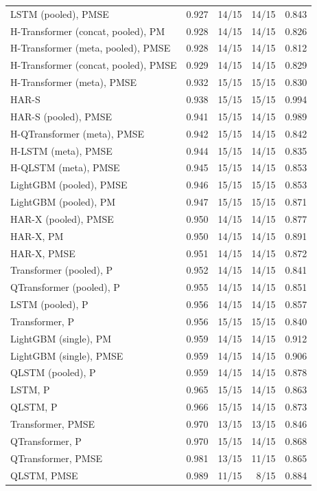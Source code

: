 \begin{tabular}{lrrrr}
LSTM (pooled), PMSE & 0.927 & 14/15 & 14/15 & 0.843 \\
H-Transformer (concat, pooled), PM & 0.928 & 14/15 & 14/15 & 0.826 \\
H-Transformer (meta, pooled), PMSE & 0.928 & 14/15 & 14/15 & 0.812 \\
H-Transformer (concat, pooled), PMSE & 0.929 & 14/15 & 14/15 & 0.829 \\
H-Transformer (meta), PMSE & 0.932 & 15/15 & 15/15 & 0.830 \\
HAR-S & 0.938 & 15/15 & 15/15 & 0.994 \\
HAR-S (pooled), PMSE & 0.941 & 15/15 & 14/15 & 0.989 \\
H-QTransformer (meta), PMSE & 0.942 & 15/15 & 14/15 & 0.842 \\
H-LSTM (meta), PMSE & 0.944 & 15/15 & 14/15 & 0.835 \\
H-QLSTM (meta), PMSE & 0.945 & 15/15 & 14/15 & 0.853 \\
LightGBM (pooled), PMSE & 0.946 & 15/15 & 15/15 & 0.853 \\
LightGBM (pooled), PM & 0.947 & 15/15 & 15/15 & 0.871 \\
HAR-X (pooled), PMSE & 0.950 & 14/15 & 14/15 & 0.877 \\
HAR-X, PM & 0.950 & 14/15 & 14/15 & 0.891 \\
HAR-X, PMSE & 0.951 & 14/15 & 14/15 & 0.872 \\
Transformer (pooled), P & 0.952 & 14/15 & 14/15 & 0.841 \\
QTransformer (pooled), P & 0.955 & 14/15 & 14/15 & 0.851 \\
LSTM (pooled), P & 0.956 & 14/15 & 14/15 & 0.857 \\
Transformer, P & 0.956 & 15/15 & 15/15 & 0.840 \\
LightGBM (single), PM & 0.959 & 14/15 & 14/15 & 0.912 \\
LightGBM (single), PMSE & 0.959 & 14/15 & 14/15 & 0.906 \\
QLSTM (pooled), P & 0.959 & 14/15 & 14/15 & 0.878 \\
LSTM, P & 0.965 & 15/15 & 14/15 & 0.863 \\
QLSTM, P & 0.966 & 15/15 & 14/15 & 0.873 \\
Transformer, PMSE & 0.970 & 13/15 & 13/15 & 0.846 \\
QTransformer, P & 0.970 & 15/15 & 14/15 & 0.868 \\
QTransformer, PMSE & 0.981 & 13/15 & 11/15 & 0.865 \\
QLSTM, PMSE & 0.989 & 11/15 & 8/15 & 0.884 \\

\end{tabular}
